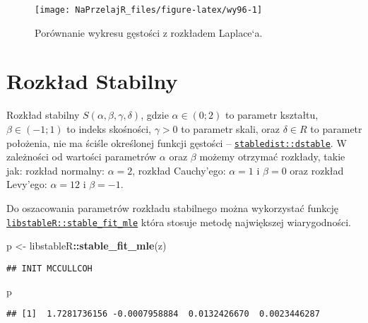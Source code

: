\documentclass[polish,]{book}
\newenvironment{Shaded}{\begin{snugshade}}{\end{snugshade}}
\newcommand{\KeywordTok}[1]{\textcolor[rgb]{0.13,0.29,0.53}{\textbf{#1}}}
\newcommand{\NormalTok}[1]{#1}
\newcommand{\OperatorTok}[1]{\textcolor[rgb]{0.81,0.36,0.00}{\textbf{#1}}}
\newcommand{\StringTok}[1]{\textcolor[rgb]{0.31,0.60,0.02}{#1}}
\begin{document}
\begin{figure}[h]

{\centering \texttt{[image: NaPrzelajR\_files/figure-latex/wy96-1]} 

}

\caption{Porównanie wykresu gęstości z rozkładem Laplace`a.}\label{fig:wy96}
\end{figure}

\hypertarget{part_9.6}{%
\section{Rozkład Stabilny}\label{part_9.6}}

Rozkład stabilny \(S(\alpha, \beta, \gamma, \delta)\), gdzie \(\alpha \in(0; 2)\) to parametr kształtu, \(\beta \in(-1; 1)\)
to indeks skośności, \(\gamma > 0\) to parametr skali, oraz \(\delta \in R\) to parametr położenia,
nie ma ściśle określonej funkcji gęstości -- \href{https://rdrr.io/cran/stabledist/man/dist-stable.html}{\texttt{stabledist::dstable}}. W zależności od wartości parametrów \(\alpha\)
oraz \(\beta\) możemy otrzymać rozkłady, takie jak: rozkład normalny: \(\alpha = 2\), rozkład
Cauchy'ego: \(\alpha = 1\) i \(\beta = 0\) oraz rozkład Levy'ego: \(\alpha = 12\) i \(\beta = -1\).

Do oszacowania parametrów rozkładu stabilnego można wykorzystać funkcję \href{https://rdrr.io/cran/libstableR/man/stable_fit.html}{\texttt{libstableR::stable\_fit\_mle}} która stosuje metodę największej wiarygodności.

\begin{Shaded}
\begin{Highlighting}[]
\NormalTok{p <-}\StringTok{ }\NormalTok{libstableR}\OperatorTok{::}\KeywordTok{stable_fit_mle}\NormalTok{(z)}
\end{Highlighting}
\end{Shaded}

\begin{verbatim}
## INIT MCCULLCOH
\end{verbatim}

\begin{Shaded}
\begin{Highlighting}[]
\NormalTok{p}
\end{Highlighting}
\end{Shaded}

\begin{verbatim}
## [1]  1.7281736156 -0.0007958884  0.0132426670  0.0023446287
\end{verbatim}
\end{document}
